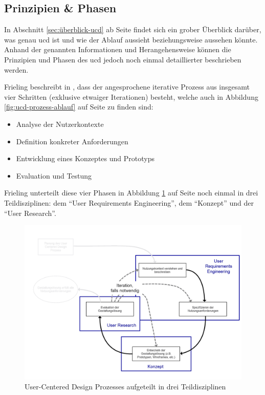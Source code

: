\documentclass[a4paper,12pt,twoside]{scrreprt}
\begin{document}
\subsection{Prinzipien \& Phasen}
\label{sub-sec:prinzipien-phasen-ucd}

In Abschnitt \ref{sec:überblick-ucd} ab Seite \pageref{sec:überblick-ucd} findet sich ein grober Überblick darüber, was genau \acl{ucd} ist und wie der Ablauf aussieht beziehungsweise aussehen könnte. Anhand der genannten Informationen und Herangehensweise können die Prinzipien und Phasen des \ac{ucd} jedoch noch einmal detaillierter beschrieben werden.

Frieling beschreibt in \cite{frieling_user_2019}, dass der angesprochene iterative Prozess aus insgesamt vier Schritten (exklusive etwaiger Iterationen) besteht, welche auch in Abbildung \ref{fig:ucd-prozess-ablauf} auf Seite \pageref{fig:ucd-prozess-ablauf} zu finden sind:
\begin{itemize}
    \item Analyse der Nutzerkontexte
    \item Definition konkreter Anforderungen
    \item Entwicklung eines Konzeptes und Prototyps
    \item Evaluation und Testung
\end{itemize}

Frieling unterteilt diese vier Phasen in Abbildung \ref{fig:ucd-prozess-teildisziplinen} auf Seite \pageref{fig:ucd-prozess-teildisziplinen} noch einmal in drei Teildisziplinen: dem \enquote{User Requirements Engineering}, dem \enquote{Konzept} und der \enquote{User Research}.

\begin{figure}[ht!]
    \centering
    \includegraphics[width=.75\linewidth]{thesis/images/Frieling_UCD-Prozess-Teildisziplinen.png}
    \caption[User-Centered Design Prozesses aufgeteilt in drei Teildisziplinen]{User-Centered Design Prozesses aufgeteilt in drei Teildisziplinen \cite{frieling_user_2019}}
    \label{fig:ucd-prozess-teildisziplinen}
\end{figure}
\end{document}
